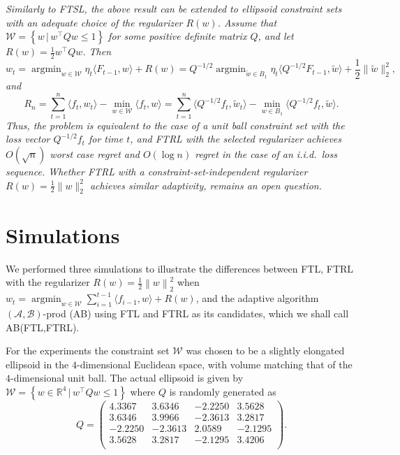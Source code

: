 \documentclass[english]{article}
\newcommand{\cA}{\mathcal{A}}
\newcommand{\cB}{\mathcal{B}}
\newcommand{\cW}{\mathcal{W}}
\newcommand{\seto}[1]{\left\{#1\right\}}
\newcommand{\R}{\mathbb{R}}
\newcommand{\inpro}[2]{\langle #1, #2\rangle}
\newcommand{\ip}[1]{\langle#1\rangle}
\newcommand{\set}[2]{\left\{#1 \,\vert\, #2 \right\}}
\newcommand{\norm}[1]{\left\| #1 \right\|}
\DeclareMathOperator*{\argmin}{argmin}
\begin{document}
\begin{remark}\em
Similarly to FTSL,  the above result can be extended to ellipsoid constraint sets with an adequate choice of the regularizer $R(w)$.
Assume that $\cW = \seto{ w \,\vert\, w^{\top}Qw \le 1}$ for some positive definite matrix $Q$, and let $R(w) = \frac{1}{2} w^{\top}Qw$. Then
\[
	w_{t} = \argmin_{w\in \cW} \eta_t \inpro{F_{t-1}}{w} + R(w) = Q^{-1/2} \argmin_{\tilde{w}\in B_1} \eta_t \inpro{Q^{-1/2}F_{t-1}}{\tilde{w}} + \frac{1}{2}\|\tilde{w}\|_2^2, 
\]
and 
\[
R_n = \sum_{t=1}^{n} \inpro{f_t}{w_t} - \min_{w\in\cW}  \inpro{f_t}{w} = \sum_{t=1}^{n} \inpro{Q^{-1/2}f_t}{\tilde{w}_t} - \min_{w\in B_1}  \inpro{Q^{-1/2}f_t}{\tilde{w}}.
\]
Thus, the problem is equivalent to the case of a unit ball constraint set with the loss vector $Q^{-1/2}f_t$ for time $t$, and FTRL with the selected regularizer achieves $O(\sqrt{n})$ worst case regret and $O(\log n)$ regret in the case of an i.i.d.\ loss sequence. Whether FTRL with a constraint-set-independent regularizer $R(w) = \frac{1}{2}\|w\|_2^2$ achieves similar adaptivity, remains an open question.
\end{remark}

\section{Simulations}
\label{sec:Simulations}
We performed three simulations to illustrate the differences between  FTL, FTRL with the regularizer $R(w) = \frac12 \norm{w}_2^2$ when
$w_t = \argmin_{w\in \cW} \sum_{i=1}^{t-1} \ip{f_{i-1},w} + R(w)$,
and the adaptive algorithm $(\cA,\cB)$-prod (AB) using FTL and FTRL as its candidates, which we shall call AB(FTL,FTRL).

For the experiments the constraint set $\cW$ was chosen to be a slightly elongated ellipsoid in the $4$-dimensional Euclidean space, with volume matching that of the $4$-dimensional unit ball.
The actual ellipsoid is given by 
$\cW = \set{w\in \R^4}{w^{\top}Qw \le 1}$
where $Q$ is randomly generated as
\[
Q  = \left(\begin{array}{cccc}
4.3367    & 3.6346   & -2.2250   & 3.5628 \\
3.6346    & 3.9966   & -2.3613   & 3.2817\\
-2.2250   & -2.3613  &  2.0589  & -2.1295\\
3.5628    & 3.2817  & -2.1295  &  3.4206\\
\end{array}\right).
\]
\end{document}
